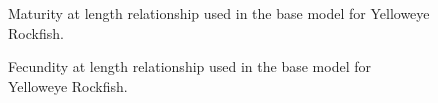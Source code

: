 \documentclass[
]{scrartcl}
\begin{document}
\begin{figure}


\caption{\label{fig-maturity}Maturity at length relationship used in the
base model for Yelloweye Rockfish.}

\end{figure}%

\begin{figure}


\caption{\label{fig-fecundity}Fecundity at length relationship used in
the base model for Yelloweye Rockfish.}

\end{figure}%
\end{document}
